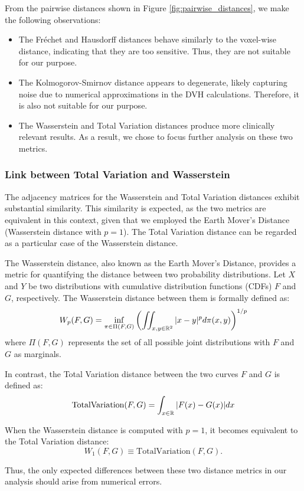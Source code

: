 From the pairwise distances shown in Figure \ref{fig:pairwise_distances}, we make the following observations:
\begin{itemize}
	\item The Fréchet and Hausdorff distances behave similarly to the voxel-wise distance, indicating that they are too sensitive.
	Thus, they are not suitable for our purpose.
	\item The Kolmogorov-Smirnov distance appears to degenerate, likely capturing noise due to numerical approximations in the DVH calculations.
	Therefore, it is also not suitable for our purpose.
	\item The Wasserstein and Total Variation distances produce more clinically relevant results.
	As a result, we chose to focus further analysis on these two metrics.
\end{itemize}


\subsubsection{Link between Total Variation and Wasserstein}
The adjacency matrices for the Wasserstein and Total Variation distances exhibit substantial similarity.
This similarity is expected, as the two metrics are equivalent in this context, given that we employed the Earth Mover's Distance (Wasserstein distance with $p=1$).
The Total Variation distance can be regarded as a particular case of the Wasserstein distance.

The Wasserstein distance, also known as the Earth Mover's Distance, provides a metric for quantifying the distance between two probability distributions.
Let $X$ and $Y$ be two distributions with cumulative distribution functions (CDFs) $F$ and $G$, respectively.
The Wasserstein distance between them is formally defined as:
$$W_p(F,G) = \inf_{\pi \in \Pi(F,G)} \left( \iint_{x,y \in \mathbb{R}^2} |{x-y}|^p d\pi(x,y) \right)^{1/p}$$
where $\Pi(F,G)$ represents the set of all possible joint distributions with $F$ and $G$ as marginals.

In contrast, the Total Variation distance between the two curves $F$ and $G$ is defined as:
$$\text{TotalVariation}(F, G) = \int_{x \in \mathbb{R}} |{F(x) - G(x)}| dx$$

When the Wasserstein distance is computed with $p=1$, it becomes equivalent to the Total Variation distance:
$$W_1(F, G) \equiv \text{TotalVariation}(F, G).$$

Thus, the only expected differences between these two distance metrics in our analysis should arise from numerical errors.

